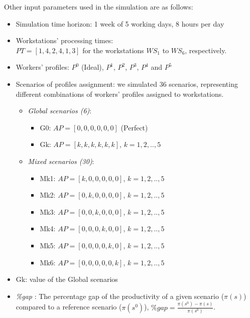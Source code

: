 \documentclass[review,12pt, 3p, times]{elsarticle}
\begin{document}
Other input parameters used in the simulation are as follows:
\begin{itemize}
    \item Simulation time horizon: 1 week of 5 working days, 8 hours per day
    \item Workstations' processing times:\\ $PT=[1,4,2,4,1,3]$ for the workstations $\textit{WS}_1$ to $\textit{WS}_6$, respectively.
    \item Workers' profiles: $P^0$ (Ideal), $P^1$, $P^2$, $P^3$, $P^4$ and $P^5$ 
    \item Scenarios of profiles assignment: we simulated 36 scenarios, representing  different combinations of workers' profiles assigned to workstations.
        \begin{itemize}
            \item  \textit{Global scenarios (6)}:
                \begin{itemize}
                    \item 	 \hspace*{0.5cm} G0: $AP=[0,0,0,0,0,0]$ (Perfect)
                    \item    \hspace*{0.5cm} Gk: $AP=[k,k,k,k,k,k]$, $k=1,2,..,5$ 
                \end{itemize}
            \item  \textit{Mixed scenarios (30)}: 
                \begin{itemize}
                    \item 	  \hspace*{0.5cm} Mk1: $AP=[k,0,0,0,0,0]$, $k=1,2,..,5$
                    \item     \hspace*{0.5cm} Mk2: $AP=[0,k,0,0,0,0]$, $k=1,2,..,5$
                    \item    \hspace*{0.5cm} Mk3: $AP=[0,0,k,0,0,0]$, $k=1,2,..,5$
                    \item    \hspace*{0.5cm} Mk4: $AP=[0,0,0,k,0,0]$, $k=1,2,..,5$
                    \item    \hspace*{0.5cm} Mk5: $AP=[0,0,0,0,k,0]$, $k=1,2,..,5$
                    \item    \hspace*{0.5cm} Mk6: $AP=[0,0,0,0,0,k]$, $k=1,2,..,5$
                \end{itemize}
        \end{itemize}
    \item Gk: value of the Global scenarios
    \item {\it{\%gap}}  :  The percentage gap of the productivity of a given scenario ($\pi(s)$) compared to a reference scenario ($\pi(s^0)$),  $\textit{\%gap}=\frac{\pi(s^0) - \pi(s)}{\pi(s^0)}$.
\end{itemize}
\end{document}
